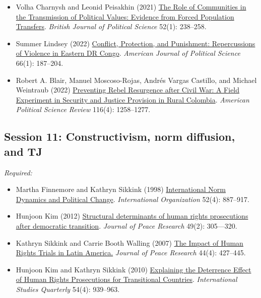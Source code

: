 \documentclass[12pt, a4paper]{article}
\begin{document}
\begin{itemize}
	\item Volha Charnysh and Leonid Peisakhin (2021) \href{https://doi.org/10.1017/S0007123420000447}{The Role of Communities in the Transmission of Political Values: Evidence from Forced Population Transfers}. \textit{British Journal of Political Science} 52(1): 238--258.
  \item Summer Lindsey (2022) \href{https://doi.org/10.1111/ajps.12637}{Conflict, Protection, and Punishment: Repercussions of Violence in Eastern DR Congo}. \textit{American Journal of Political Science} 66(1): 187--204.
	\item Robert A. Blair, Manuel Moscoso-Rojas, Andrés Vargas Castillo, and Michael Weintraub (2022) \href{https://doi.org/10.1017/S0003055422000284}{Preventing Rebel Resurgence after Civil War: A Field Experiment in Security and Justice Provision in Rural Colombia}. \textit{American Political Science Review} 116(4): 1258--1277.
\end{itemize}

\vspace{20pt}
\hline
\subsection*{Session 11: Constructivism, norm diffusion, and TJ}

\noindent\textit{Required:}

\begin{itemize}
	\item Martha Finnemore and Kathryn Sikkink (1998) \href{https://doi.org/10.1162/002081898550789}{International Norm Dynamics and Political Change}. \textit{International Organization} 52(4): 887--917.
  \item Hunjoon Kim (2012) \href{https://doi.org/10.1177/0022343311431600}{Structural determinants of human rights prosecutions after democratic transition}. \textit{Journal of Peace Research} 49(2): 305---320.
	\item Kathryn Sikkink and Carrie Booth Walling (2007) \href{https://doi.org/10.1177/0022343307078953}{The Impact of Human Rights Trials in Latin America.} \textit{Journal of Peace Research} 44(4): 427--445.
	\item Hunjoon Kim and Kathryn Sikkink (2010) \href{https://doi.org/10.1111/j.1468-2478.2010.00621.x}{Explaining the Deterrence Effect of Human Rights Prosecutions for Transitional Countries}. \textit{International Studies Quarterly} 54(4): 939--963.
\end{itemize}
\end{document}
